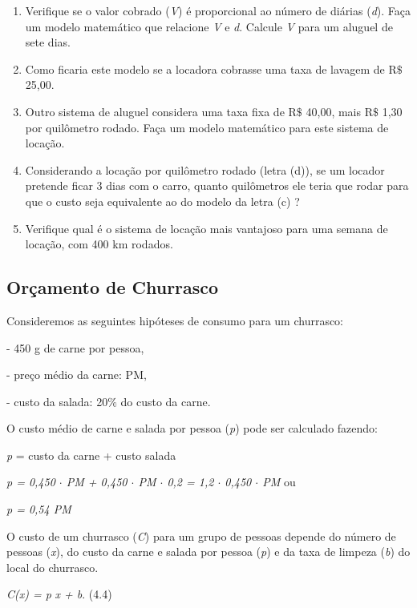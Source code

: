 \begin{enumerate}
	\item Verifique se o valor cobrado (\textit{V}) é proporcional ao número de diárias (\textit{d}). Faça um modelo matemático que relacione \textit{V} e \textit{d}. Calcule \textit{V} para um aluguel de sete dias.

	\item Como ficaria este modelo se a locadora cobrasse uma taxa de lavagem de R$\$$  25,00.

	\item Outro sistema de aluguel considera uma taxa fixa de R$\$$  40,00, mais R$\$$  1,30 por quilômetro rodado. Faça um modelo matemático para este sistema de locação.

	\item Considerando a locação por quilômetro rodado (letra (d)), se um locador pretende ficar 3 dias com o carro, quanto quilômetros ele teria que rodar para que o custo seja equivalente ao do modelo da letra (c) ?

	\item Verifique qual é o sistema de locação mais vantajoso para uma semana de locação, com 400 km rodados.
\end{enumerate}

\subsection{Orçamento de Churrasco}

Consideremos as seguintes hipóteses de consumo para um churrasco:

- 450 g de carne por pessoa, 

- preço médio da carne: PM,

- custo da salada: 20$\%$  do custo da carne.

O custo médio de carne e salada por pessoa (\textit{p}) pode ser calculado fazendo:

\textit{p} = custo da carne + custo salada      

\textit{p = 0,450 $ \cdot $  PM  + 0,450 $ \cdot $  PM $ \cdot $  0,2 = 1,2 $ \cdot $  0,450 $ \cdot $  PM}   ou

\textit{p =  0,54 PM}

O custo de um churrasco (\textit{C}) para um grupo de pessoas depende do número de pessoas (\textit{x}), do custo da carne e salada por pessoa (\textit{p}) e da taxa de limpeza (\textit{b}) do local do churrasco.

\begin{FlushRight}
\textit{C(x) = p} \textit{x + b}. \tab (4.4)
\end{FlushRight}

